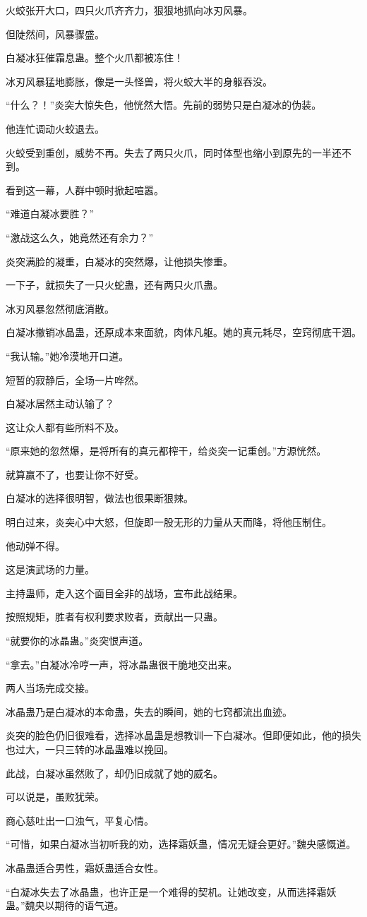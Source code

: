 \begin{this_body}
火蛟张开大口，四只火爪齐齐力，狠狠地抓向冰刃风暴。

但陡然间，风暴骤盛。

白凝冰狂催霜息蛊。整个火爪都被冻住！

冰刃风暴猛地膨胀，像是一头怪兽，将火蛟大半的身躯吞没。

“什么？！”炎突大惊失色，他恍然大悟。先前的弱势只是白凝冰的伪装。

他连忙调动火蛟退去。

火蛟受到重创，威势不再。失去了两只火爪，同时体型也缩小到原先的一半还不到。

看到这一幕，人群中顿时掀起喧嚣。

“难道白凝冰要胜？”

“激战这么久，她竟然还有余力？”

炎突满脸的凝重，白凝冰的突然爆，让他损失惨重。

一下子，就损失了一只火蛇蛊，还有两只火爪蛊。

冰刃风暴忽然彻底消散。

白凝冰撤销冰晶蛊，还原成本来面貌，肉体凡躯。她的真元耗尽，空窍彻底干涸。

“我认输。”她冷漠地开口道。

短暂的寂静后，全场一片哗然。

白凝冰居然主动认输了？

这让众人都有些所料不及。

“原来她的忽然爆，是将所有的真元都榨干，给炎突一记重创。”方源恍然。

就算赢不了，也要让你不好受。

白凝冰的选择很明智，做法也很果断狠辣。

明白过来，炎突心中大怒，但旋即一股无形的力量从天而降，将他压制住。

他动弹不得。

这是演武场的力量。

主持蛊师，走入这个面目全非的战场，宣布此战结果。

按照规矩，胜者有权利要求败者，贡献出一只蛊。

“就要你的冰晶蛊。”炎突恨声道。

“拿去。”白凝冰冷哼一声，将冰晶蛊很干脆地交出来。

两人当场完成交接。

冰晶蛊乃是白凝冰的本命蛊，失去的瞬间，她的七窍都流出血迹。

炎突的脸色仍旧很难看，选择冰晶蛊是想教训一下白凝冰。但即便如此，他的损失也过大，一只三转的冰晶蛊难以挽回。

此战，白凝冰虽然败了，却仍旧成就了她的威名。

可以说是，虽败犹荣。

商心慈吐出一口浊气，平复心情。

“可惜，如果白凝冰当初听我的劝，选择霜妖蛊，情况无疑会更好。”魏央感慨道。

冰晶蛊适合男性，霜妖蛊适合女性。

“白凝冰失去了冰晶蛊，也许正是一个难得的契机。让她改变，从而选择霜妖蛊。”魏央以期待的语气道。

\end{this_body}

